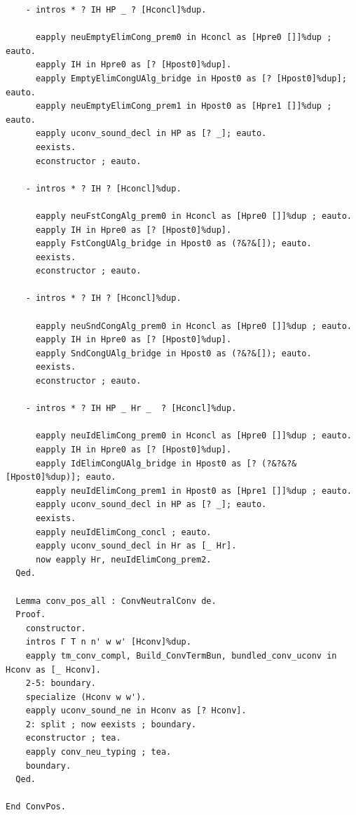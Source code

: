 \begin{lstlisting}
    - intros * ? IH HP _ ? [Hconcl]%dup.

      eapply neuEmptyElimCong_prem0 in Hconcl as [Hpre0 []]%dup ; eauto.
      eapply IH in Hpre0 as [? [Hpost0]%dup].
      eapply EmptyElimCongUAlg_bridge in Hpost0 as [? [Hpost0]%dup]; eauto.
      eapply neuEmptyElimCong_prem1 in Hpost0 as [Hpre1 []]%dup ; eauto.
      eapply uconv_sound_decl in HP as [? _]; eauto.
      eexists.
      econstructor ; eauto.

    - intros * ? IH ? [Hconcl]%dup.

      eapply neuFstCongAlg_prem0 in Hconcl as [Hpre0 []]%dup ; eauto.
      eapply IH in Hpre0 as [? [Hpost0]%dup].
      eapply FstCongUAlg_bridge in Hpost0 as (?&?&[]); eauto.
      eexists.
      econstructor ; eauto.

    - intros * ? IH ? [Hconcl]%dup.

      eapply neuSndCongAlg_prem0 in Hconcl as [Hpre0 []]%dup ; eauto.
      eapply IH in Hpre0 as [? [Hpost0]%dup].
      eapply SndCongUAlg_bridge in Hpost0 as (?&?&[]); eauto.
      eexists.
      econstructor ; eauto.

    - intros * ? IH HP _ Hr _  ? [Hconcl]%dup.

      eapply neuIdElimCong_prem0 in Hconcl as [Hpre0 []]%dup ; eauto.
      eapply IH in Hpre0 as [? [Hpost0]%dup].
      eapply IdElimCongUAlg_bridge in Hpost0 as [? (?&?&?&[Hpost0]%dup)]; eauto.
      eapply neuIdElimCong_prem1 in Hpost0 as [Hpre1 []]%dup ; eauto.
      eapply uconv_sound_decl in HP as [? _]; eauto.
      eexists.
      eapply neuIdElimCong_concl ; eauto.
      eapply uconv_sound_decl in Hr as [_ Hr].
      now eapply Hr, neuIdElimCong_prem2.
  Qed.

  Lemma conv_pos_all : ConvNeutralConv de.
  Proof.
    constructor.
    intros Γ T n n' w w' [Hconv]%dup.
    eapply tm_conv_compl, Build_ConvTermBun, bundled_conv_uconv in Hconv as [_ Hconv].
    2-5: boundary.
    specialize (Hconv w w').
    eapply uconv_sound_ne in Hconv as [? Hconv].
    2: split ; now eexists ; boundary.
    econstructor ; tea.
    eapply conv_neu_typing ; tea.
    boundary.
  Qed.

End ConvPos.
\end{lstlisting}
